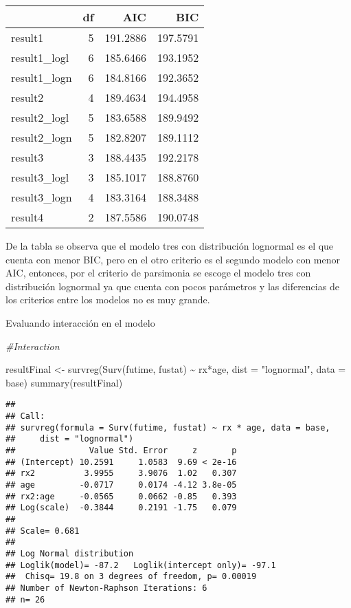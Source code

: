 \documentclass[
]{article}
\newenvironment{Shaded}{\begin{snugshade}}{\end{snugshade}}
\newcommand{\AttributeTok}[1]{\textcolor[rgb]{0.77,0.63,0.00}{#1}}
\newcommand{\CommentTok}[1]{\textcolor[rgb]{0.56,0.35,0.01}{\textit{#1}}}
\newcommand{\FunctionTok}[1]{\textcolor[rgb]{0.00,0.00,0.00}{#1}}
\newcommand{\NormalTok}[1]{#1}
\newcommand{\OtherTok}[1]{\textcolor[rgb]{0.56,0.35,0.01}{#1}}
\newcommand{\SpecialCharTok}[1]{\textcolor[rgb]{0.00,0.00,0.00}{#1}}
\newcommand{\StringTok}[1]{\textcolor[rgb]{0.31,0.60,0.02}{#1}}
\begin{document}
\begin{table}
\centering
\begin{tabular}{l|r|r|r}
\hline
  & df & AIC & BIC\\
\hline
result1 & 5 & 191.2886 & 197.5791\\
\hline
result1\_logl & 6 & 185.6466 & 193.1952\\
\hline
result1\_logn & 6 & 184.8166 & 192.3652\\
\hline
result2 & 4 & 189.4634 & 194.4958\\
\hline
result2\_logl & 5 & 183.6588 & 189.9492\\
\hline
result2\_logn & 5 & 182.8207 & 189.1112\\
\hline
result3 & 3 & 188.4435 & 192.2178\\
\hline
result3\_logl & 3 & 185.1017 & 188.8760\\
\hline
result3\_logn & 4 & 183.3164 & 188.3488\\
\hline
result4 & 2 & 187.5586 & 190.0748\\
\hline
\end{tabular}
\end{table}

De la tabla se observa que el modelo tres con distribución lognormal es
el que cuenta con menor BIC, pero en el otro criterio es el segundo
modelo con menor AIC, entonces, por el criterio de parsimonia se escoge
el modelo tres con distribución lognormal ya que cuenta con pocos
parámetros y las diferencias de los criterios entre los modelos no es
muy grande.

Evaluando interacción en el modelo

\begin{Shaded}
\begin{Highlighting}[]
\CommentTok{\#Interaction}

\NormalTok{resultFinal }\OtherTok{\textless{}{-}} \FunctionTok{survreg}\NormalTok{(}\FunctionTok{Surv}\NormalTok{(futime, fustat) }\SpecialCharTok{\textasciitilde{}}\NormalTok{ rx}\SpecialCharTok{*}\NormalTok{age, }\AttributeTok{dist =} \StringTok{"lognormal"}\NormalTok{, }\AttributeTok{data =}\NormalTok{ base)}
\FunctionTok{summary}\NormalTok{(resultFinal)}
\end{Highlighting}
\end{Shaded}

\begin{verbatim}
## 
## Call:
## survreg(formula = Surv(futime, fustat) ~ rx * age, data = base, 
##     dist = "lognormal")
##               Value Std. Error     z       p
## (Intercept) 10.2591     1.0583  9.69 < 2e-16
## rx2          3.9955     3.9076  1.02   0.307
## age         -0.0717     0.0174 -4.12 3.8e-05
## rx2:age     -0.0565     0.0662 -0.85   0.393
## Log(scale)  -0.3844     0.2191 -1.75   0.079
## 
## Scale= 0.681 
## 
## Log Normal distribution
## Loglik(model)= -87.2   Loglik(intercept only)= -97.1
##  Chisq= 19.8 on 3 degrees of freedom, p= 0.00019 
## Number of Newton-Raphson Iterations: 6 
## n= 26
\end{verbatim}
\end{document}

